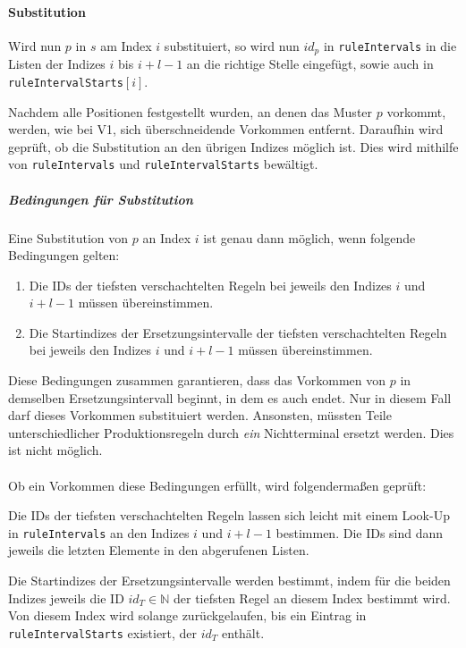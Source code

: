 \paragraph{Substitution}
Wird nun $p$ in $s$ am Index $i$ substituiert, so wird nun $id_p$ in \texttt{ruleIntervals} in die Listen der Indizes $i$ bis $i + l - 1$ an die richtige Stelle eingefügt, sowie auch in \texttt{ruleIntervalStarts}$[i]$.

Nachdem alle Positionen festgestellt wurden, an denen das Muster $p$ vorkommt, werden, wie bei V1, sich überschneidende Vorkommen entfernt. Daraufhin wird geprüft, ob die Substitution an den übrigen Indizes möglich ist. Dies wird mithilfe von \texttt{ruleIntervals} und \texttt{ruleIntervalStarts} bewältigt.

\subparagraph{Bedingungen für Substitution} Eine Substitution von $p$ an Index $i$ ist genau dann möglich, wenn folgende Bedingungen gelten:

\begin{enumerate}
	\item Die IDs der tiefsten verschachtelten Regeln bei jeweils den Indizes $i$ und $i + l - 1$ müssen übereinstimmen.
	\item Die Startindizes der Ersetzungsintervalle der tiefsten verschachtelten Regeln bei jeweils den Indizes $i$ und $i + l - 1$ müssen übereinstimmen. 
\end{enumerate}

Diese Bedingungen zusammen garantieren, dass das Vorkommen von $p$ in demselben Ersetzungsintervall beginnt, in dem es auch endet. Nur in diesem Fall darf dieses Vorkommen substituiert werden. Ansonsten, müssten Teile unterschiedlicher Produktionsregeln durch \textit{ein} Nichtterminal ersetzt werden. Dies ist nicht möglich.\\\\
Ob ein Vorkommen diese Bedingungen erfüllt, wird folgendermaßen geprüft:

Die IDs der tiefsten verschachtelten Regeln lassen sich leicht mit einem Look-Up in \texttt{ruleIntervals} an den Indizes $i$ und $i + l - 1$ bestimmen. Die IDs sind dann jeweils die letzten Elemente in den abgerufenen Listen.

Die Startindizes der Ersetzungsintervalle werden bestimmt, indem für die beiden Indizes jeweils die ID $id_T \in \mathbb{N}$ der tiefsten Regel an diesem Index bestimmt wird. Von diesem Index wird solange zurückgelaufen, bis ein Eintrag in \texttt{ruleIntervalStarts} existiert, der $id_T$ enthält.

